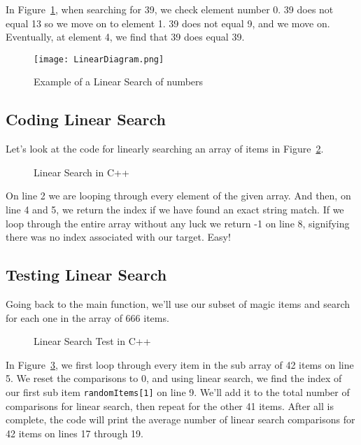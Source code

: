 \documentclass[letterpaper, 10pt,DIV=13]{scrartcl}
\numberwithin{equation}{section} %
\numberwithin{figure}{section} %
\numberwithin{table}{section} %
\begin{document}
In Figure~\ref{figure:LinearDiagram}, when searching for 39, we check element number 0. 39 does not equal 13 so we move on to element 1. 39 does not equal 9, and we move on. Eventually, at element 4, we find that 39 does equal 39.


\begin{figure}[h] 
    \centering 
    \texttt{[image: LinearDiagram.png]}
    \caption{Example of a Linear Search of numbers\footnotemark}
    \label{figure:LinearDiagram}
    
\end{figure}

\subsection{Coding Linear Search}
Let's look at the code for linearly searching an array of items in Figure~\ref{figure:LinearSearch}.

\begin{figure}[ht] 
    \centering 
    
    \caption{Linear Search in C++}
    \label{figure:LinearSearch}
\end{figure}

On line 2 we are looping through every element of the given array. And then, on line 4 and 5, we return the index if we have found an exact string match. If we loop through the entire array without any luck we return -1 on line 8, signifying there was no index associated with our target. Easy!


\pagebreak


\subsection{Testing Linear Search}
Going back to the main function, we'll use our subset of magic items and search for each one in the array of 666 items.

\begin{figure}[ht] 
    \centering 
    
    \caption{Linear Search Test in C++}
    \label{figure:LinearTest}
\end{figure}

In Figure~\ref{figure:LinearTest}, we first loop through every item in the sub array of 42 items on line 5. We reset the comparisons to 0, and using linear search, we find the index of our first sub item \texttt{randomItems[1]} on line 9. We'll add it to the total number of comparisons for linear search, then repeat for the other 41 items. After all is complete, the code will print the average number of linear search comparisons for 42 items on lines 17 through 19.
\end{document}
